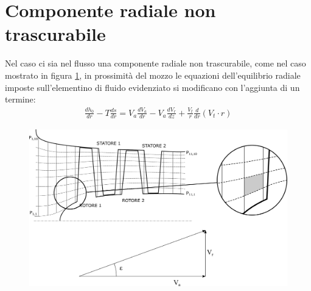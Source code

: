 \section{Componente radiale non trascurabile}
Nel caso ci sia nel flusso una componente radiale non trascurabile, come nel caso mostrato in figura \ref{fd:comp_rad}, in prossimità del mozzo le equazioni dell'equilibrio radiale imposte sull'elementino di fluido evidenziato si modificano con l'aggiunta di un termine:
\begin{align*}
\frac{d h_0}{dr} - T\frac{ds}{dr} = V_a \frac{dV_a}{dr} - \boxed{V_a \frac{dV_r}{dz}} + \frac{V_t}{r} \frac{d}{dr} ( V_t \cdot r)
\end{align*}
\begin{figure}
\centering
  \includegraphics[width=.8\textwidth]{fig/comp_rad.pdf}
\caption{}
\label{fd:comp_rad}
\end{figure}
